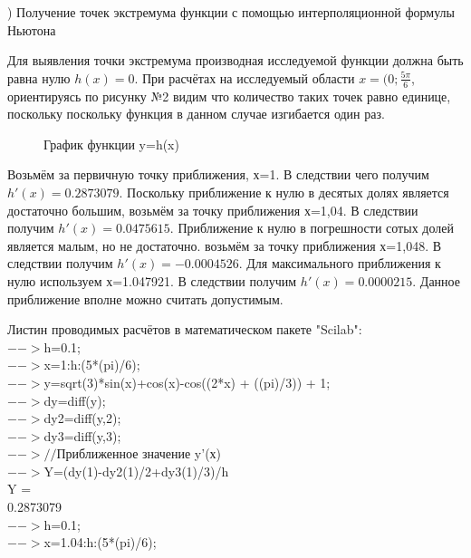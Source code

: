 \documentclass[russian,utf8,nocolumnxxxi,nocolumnxxxii]{eskdtext}
\begin{document}
) Получение точек экстремума функции с помощью интерполяционной формулы Ньютона

Для выявления точки экстремума производная исследуемой функции должна быть равна нулю $h(x)=0$. При расчётах на исследуемый области $x=(0;\frac{5\pi}{6}$, ориентируясь по рисунку №2 видим что количество таких точек равно единице, поскольку поскольку функция в данном случае изгибается один раз.

\begin{figure}[h]
\caption*{График функции y=h(x)}
\label{ris:RS2.png}
\end{figure}

Возьмём за первичную точку приближения, х=1. В следствии чего получим $h'(x)=0.2873079$. Поскольку приближение к нулю в десятых долях является достаточно большим, возьмём за точку приближения х=1,04. В следствии получим $h'(x)=0.0475615$. Приближение к нулю в погрешности сотых долей является малым, но не достаточно. возьмём за точку приближения х=1,048. В следствии получим $h'(x)=- 0.0004526$. Для максимального приближения к нулю используем х=1.047921. В следствии получим $h'(x)=0.0000215$. Данное приближение вполне можно считать допустимым.

Листин проводимых расчётов в математическом пакете "Scilab":\\
  $-->$h=0.1;\\

  $-->$x=1:h:(5*(pi)/6);\\

  $-->$y=sqrt(3)*sin(x)+cos(x)-cos((2*x) + ((pi)/3)) + 1;\\

  $-->$dy=diff(y);\\

  $-->$dy2=diff(y,2);\\

  $-->$dy3=diff(y,3);\\

  $-->//$Приближенное значение y’(х)\\

  $-->$Y=(dy(1)-dy2(1)/2+dy3(1)/3)/h\\
 Y  =\\

    0.2873079\\

  $-->$h=0.1;\\

  $-->$x=1.04:h:(5*(pi)/6);\\
\end{document}
